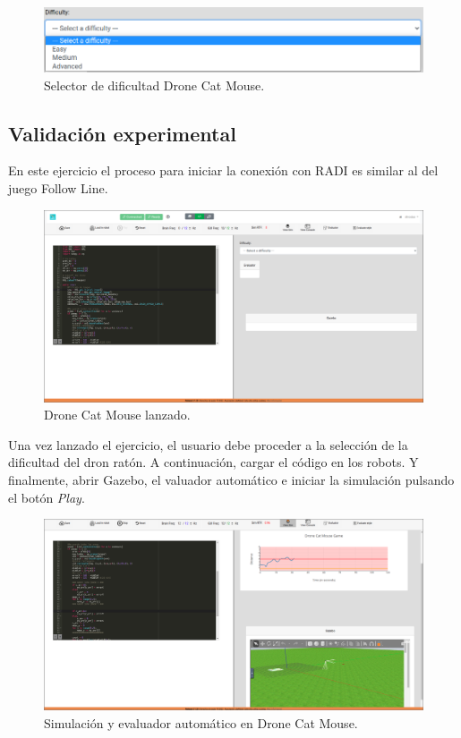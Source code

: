\documentclass[a4paper, 12pt]{book}
\begin{document}
\begin{figure}[H]
	\centering
    \includegraphics[width=15cm]{img/drone_cat_mouse_difficulty.png}
    \caption{Selector de dificultad Drone Cat Mouse.}
    \label{figura:evaluator_drone}
\end{figure}

\subsection{Validación experimental}

En este ejercicio el proceso para iniciar la conexión con RADI es similar al del juego Follow Line. 

\begin{figure}[H]
	\centering
    \includegraphics[width=12cm]{img/dcm_conectado.png}
    \caption{Drone Cat Mouse lanzado.}
    \label{figura:evaluator_drone}
\end{figure}

Una vez lanzado el ejercicio, el usuario debe proceder a la selección de la dificultad del dron ratón. A continuación, cargar el código en los robots. Y finalmente, abrir Gazebo, el valuador automático e iniciar la simulación pulsando el botón \emph{Play}.

\begin{figure}[H]
	\centering
    \includegraphics[width=12cm]{img/dcm_sim.png}
    \caption{Simulación y evaluador automático en Drone Cat Mouse.}
\end{figure}
\end{document}
